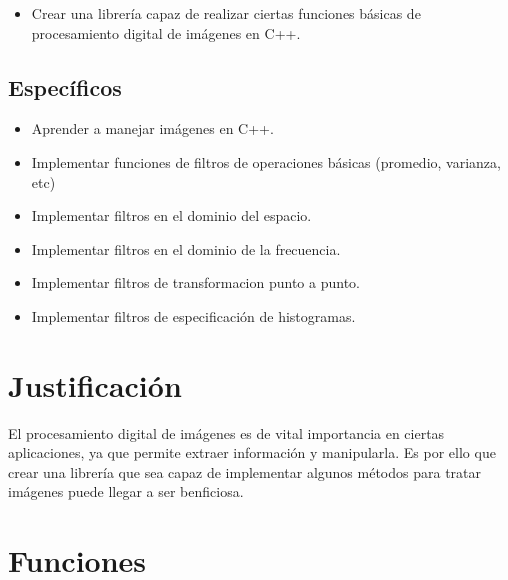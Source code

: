 \documentclass[letterpaper]{article}
\begin{document}
		\begin{itemize}

		\item Crear una librería capaz de realizar ciertas funciones básicas de procesamiento digital de imágenes en C++.

		\end{itemize}

	\subsection{Específicos}

		\begin{itemize}
     
        	\item{Aprender a manejar imágenes en C++.}

			\item{Implementar funciones de filtros de operaciones básicas (promedio, varianza, etc)}

			\item{Implementar filtros en el dominio del espacio.}
            
            \item{Implementar filtros en el dominio de la frecuencia.}
            
            \item{Implementar filtros de transformacion punto a punto.}
            
            \item{Implementar filtros de especificación de histogramas.}

		\end{itemize}

\section{Justificación}

El procesamiento digital de imágenes es de vital importancia en ciertas aplicaciones, ya que permite extraer información y manipularla. Es por ello que crear una librería que sea capaz de implementar algunos métodos para tratar imágenes puede llegar a ser benficiosa.

\section{Funciones}
\end{document}
